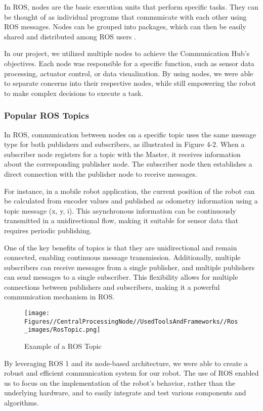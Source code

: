 In ROS, nodes are the basic execution units that perform specific tasks. They can be thought of as individual programs that communicate with each other using ROS messages. Nodes can be grouped into packages, which can then be easily shared and distributed among ROS users \cite{fairchild2016ros}.


In our project, we utilized multiple nodes to achieve the Communication Hub's objectives. Each node was responsible for a specific function, such as sensor data processing, actuator control, or data visualization. By using nodes, we were able to separate concerns into their respective nodes, while still empowering the robot to make complex decisions to execute a task.

\subsubsection{Popular ROS Topics}

In ROS, communication between nodes on a specific topic uses the same message type for both publishers and subscribers, as illustrated in Figure 4-2. When a subscriber node registers for a topic with the Master, it receives information about the corresponding publisher node. The subscriber node then establishes a direct connection with the publisher node to receive messages.

For instance, in a mobile robot application, the current position of the robot can be calculated from encoder values and published as odometry information using a topic message (x, y, i). This asynchronous information can be continuously transmitted in a unidirectional flow, making it suitable for sensor data that requires periodic publishing.

One of the key benefits of topics is that they are unidirectional and remain connected, enabling continuous message transmission. Additionally, multiple subscribers can receive messages from a single publisher, and multiple publishers can send messages to a single subscriber. This flexibility allows for multiple connections between publishers and subscribers, making it a powerful communication mechanism in ROS\cite{pyo2017ros}.

\begin{figure}[h]
\centering
\texttt{[image: Figures//CentralProcessingNode//UsedToolsAndFrameworks//Ros\_images/RosTopic.png]}
\caption{Example of a ROS Topic}
\end{figure}

By leveraging ROS 1 and its node-based architecture, we were able to create a robust and efficient communication system for our robot. The use of ROS enabled us to focus on the implementation of the robot's behavior, rather than the underlying hardware, and to easily integrate and test various components and algorithms.
